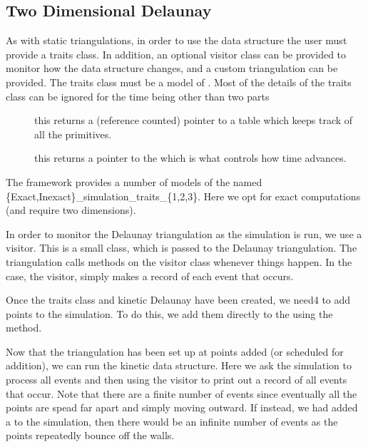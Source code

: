 

\subsection{Two Dimensional Delaunay}
\label{sec:delaunay_2_example}

As with static triangulations, in order to use the data structure the
user must provide a traits class. In addition, an optional visitor
class can be provided to monitor how the data structure changes, and a
custom triangulation can be provided. The traits class must be a model
of . Most of the details of the traits class can
be ignored for the time being other than two parts 
\begin{description}
\item[] this returns a (reference counted) pointer to a table which keeps track of all the primitives.
\item[] this returns a pointer to the  which is what controls how time advances.
\end{description}
The framework provides a number of models of the
 named
\{Exact,Inexact\}\_simulation\_traits\_\{1,2,3\}. Here we opt for
exact computations (and require two dimensions).

In order to monitor the Delaunay triangulation as the simulation is
run, we use a visitor. This is a small class, which is passed to the
Delaunay triangulation. The triangulation calls methods on the visitor
class whenever things happen. In the case, the visitor,
 simply makes a record of each event that occurs.

Once the traits class and kinetic Delaunay have been created, we need4
to add points to the simulation. To do this, we add them directly to
the
 using the  method. 


Now that the triangulation has been set up at points added (or
scheduled for addition), we can run the kinetic data structure. Here
we ask the simulation to process all events and then using the visitor
to print out a record of all events that occur. Note that there are a
finite number of events since eventually all the points are spead far
apart and simply moving outward. If instead, we had added a
 to the simulation, then 
there would be an infinite number of events as the points repeatedly
bounce off the walls.

